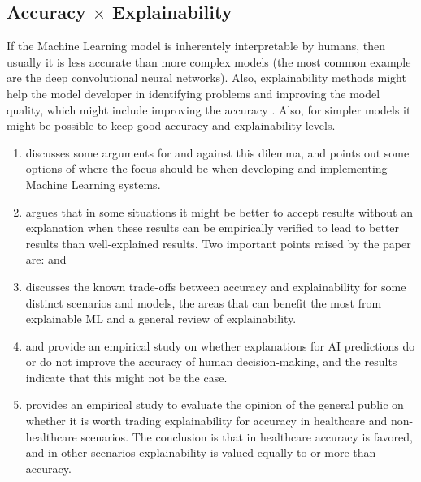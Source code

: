 \subsection{Accuracy $\times$ Explainability}

If the Machine Learning model is inherentely interpretable by humans, then usually it is less accurate than more complex models (the most common example are the deep convolutional neural networks). Also, explainability methods might help the model developer in identifying problems and improving the model quality, which might include improving the accuracy \cite{A Survey on the Explainability of Supervised Machine Learning}. Also, for simpler models it might be possible to keep good accuracy and explainability levels.

\begin{enumerate}
\item \cite{It is Not Accuracy vs. Explainability We Need Both for Trustworthy AI Systems} discusses some arguments for and against this dilemma, and points out some options of where the focus should be when developing and implementing Machine Learning systems.
\item \cite{Artificial Intelligence and Black-Box Medical Decisions: Accuracy versus Explainability} argues that in some situations it might be better to accept results without an explanation when these results can be empirically verified to lead to better results than well-explained results. Two important points raised by the paper are:  and 
\item \cite{Explainable artificial intelligence: an analytical review} discusses the known trade-offs between accuracy and explainability for some distinct scenarios and models, the areas that can benefit the most from explainable ML and a general review of explainability.
\item \cite{It's Just Not That Simple: An Empirical Study of the Accuracy-Explainability Trade-off in Machine Learning for Public Policy} and \cite{Does Explainable Artificial Intelligence Improve Human Decision-Making?} provide an empirical study on whether explanations for AI predictions do or do not improve the accuracy of human decision-making, and the results indicate that this might not be the case.
\item \cite{Trading off accuracy and explainability in AI decision-making: findings from 2 citizens' juries} provides an empirical study to evaluate the opinion of the general public on whether it is worth trading explainability for accuracy in healthcare and non-healthcare scenarios. The conclusion is that in healthcare accuracy is favored, and in other scenarios explainability is valued equally to or more than accuracy.
\end{enumerate}

